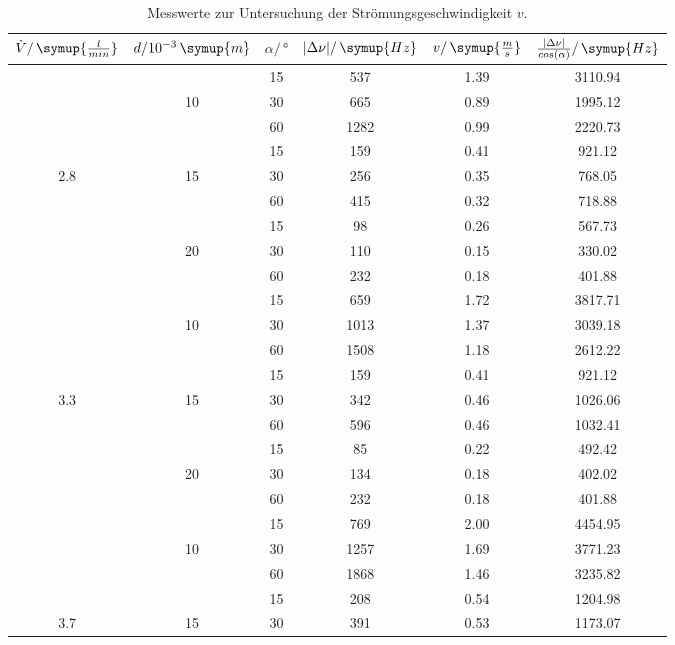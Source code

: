 \begin{table}[htbp]
\centering
\caption{Messwerte zur Untersuchung der Strömungsgeschwindigkeit $v$.}
\label{tab:stroemi}
\begin{tabular}{S[table-format=1.1] S[table-format=2] S S[table-format=4] S[table-format=1.4] S[table-format=4.2]}
\toprule
{$\dot{V}/ \, \symup{\frac{l}{min}}$} & {$d/10^{-3}\, \symup{m}$} & {$\alpha/ \, °$} & {$\lvert \Delta \nu \rvert / \, \symup{Hz}$} & {$v /\,\symup{\frac{m}{s}}$} & {$\frac{\lvert \Delta \nu \rvert}{cos(\alpha)} /\,\symup{Hz}$}  \\
\midrule
        &       & 15 & 537 & 1.39 & 3110.94\\
        & 10    & 30 & 665 & 0.89 & 1995.12\\
        &       & 60 & 1282 & 0.99 & 2220.73\\
        &       & 15 & 159 & 0.41 & 921.12\\
2.8     & 15    & 30 & 256 & 0.35 & 768.05\\
        &       & 60 & 415 & 0.32 & 718.88\\
        &       & 15 & 98 & 0.26 & 567.73\\
        & 20    & 30 & 110 & 0.15 & 330.02\\
        &       & 60 & 232 & 0.18 & 401.88\\
\midrule
        &       & 15 & 659 & 1.72 & 3817.71\\
        & 10    & 30 & 1013 & 1.37 & 3039.18\\
        &       & 60 & 1508 & 1.18 & 2612.22\\
        &       & 15 & 159 & 0.41 & 921.12\\
3.3     & 15    & 30 & 342 & 0.46 & 1026.06\\
        &       & 60 & 596 & 0.46 & 1032.41\\
        &       & 15 & 85  & 0.22 & 492.42\\
        & 20    & 30 & 134 & 0.18 & 402.02\\
        &       & 60 & 232 & 0.18 & 401.88\\
\midrule
        &       & 15 & 769 & 2.00 & 4454.95\\
        & 10    & 30 & 1257 & 1.69 & 3771.23\\
        &       & 60 & 1868 & 1.46 & 3235.82\\
        &       & 15 & 208 & 0.54 & 1204.98\\
3.7     & 15    & 30 & 391 & 0.53 & 1173.07\\

\end{tabular}
\end{table}
